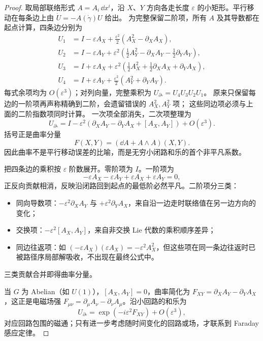 \begin{proof}
取局部联络形式 $A=A_i\,\dd x^i$，沿 $X$、$Y$ 方向各走长度 $\varepsilon$ 的小矩形。平行移动在每条边上由 $\dot U=-A(\dot\gamma)U$ 给出。
为完整保留二阶项，所有 $A$ 及其导数都在起点计算，四条边分别为
\[
\begin{aligned}
U_1&=I-\varepsilon A_X+\tfrac{\varepsilon^2}{2}(A_X^2-\partial_XA_X),\\
U_2&=I-\varepsilon A_Y+\varepsilon^2(\tfrac12A_Y^2-\partial_XA_Y-\tfrac12\partial_YA_Y),\\
U_3&=I+\varepsilon A_X+\varepsilon^2(\tfrac12A_X^2+\tfrac12\partial_XA_X+\partial_YA_X),\\
U_4&=I+\varepsilon A_Y+\tfrac{\varepsilon^2}{2}(A_Y^2+\partial_YA_Y).
\end{aligned}
\]
每式余项均为 $O(\varepsilon^3)$；对列向量，完整乘积为
$U_{\partial\square}=U_4U_3U_2U_1$。
原来只保留每边的一阶项再声称精确到二阶，会遗留错误的 $A_X^2,A_Y^2$ 项；
这些同边项必须与上面的二阶指数项同时计算。
一次项全部消失，二次项整理为
\[
U_{\partial\square}
=I-\varepsilon^2
\left(
\partial_XA_Y-
\partial_YA_X+[A_X,A_Y]
\right)
+O(\varepsilon^3).
\]
括号正是曲率分量
\[
F(X,Y)
=(\dd A+A\wedge A)(X,Y).
\]
因此曲率不是平行移动误差的比喻，而是无穷小闭路和乐的首个非平凡系数。

把四条边的乘积按 $\varepsilon$ 阶数展开。零阶项为 $I$。一阶项为
\begin{equation*}
-\varepsilon A_X-\varepsilon A_Y+\varepsilon A_X+\varepsilon A_Y=0,
\end{equation*}
正反向贡献相消，反映沿闭路回到起点的最低阶必然平凡。二阶项分三类：
\begin{itemize}
\item 同向导数项：$-\varepsilon^2\partial_XA_Y$ 与 $+\varepsilon^2\partial_YA_X$，来自沿一边走时联络值在另一边方向的变化；
\item 交换项：$-\varepsilon^2[A_X,A_Y]$，来自非交换 Lie 代数的乘积顺序差异；
\item 同边往返项：如 $(-\varepsilon A_X)(\varepsilon A_X)=-\varepsilon^2A_X^2$，但这些项在同一条边往返时已被路径序局部解吸收，不出现在最终公式中。
\end{itemize}
三类贡献合并即得曲率分量。

当 $G$ 为 Abelian（如 $U(1)$），$[A_X,A_Y]=0$，曲率简化为 $F_{XY}=\partial_XA_Y-\partial_YA_X$，这正是电磁场强 $F_{\mu\nu}=\partial_\mu A_\nu-\partial_\nu A_\mu$。沿小回路的和乐为
\begin{equation*}
U_{\partial\square}=\exp\left(-i\varepsilon^2F_{XY}\right)+O(\varepsilon^3),
\end{equation*}
对应回路包围的磁通；只有进一步考虑随时间变化的回路或场，才联系到 Faraday 感应定律。


\end{proof}
